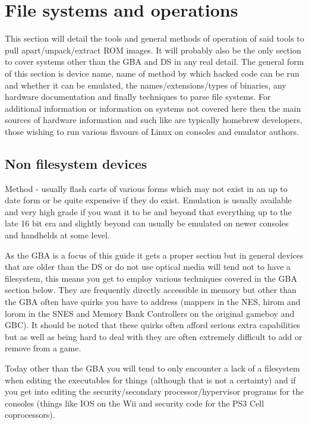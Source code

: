 \documentclass[
]{book}
\begin{document}
\hypertarget{file-systems-and-operations}{%
\section{File systems and operations}\label{file-systems-and-operations}}

This section will detail the tools and general methods of operation of said tools to pull apart/unpack/extract ROM images. It will probably also be the only section to cover systems other than the GBA and DS in any real detail. The general form of this section is device name, name of method by which hacked code can be run and whether it can be emulated, the names/extensions/types of binaries, any hardware documentation and finally techniques to parse file systems. For additional information or information on systems not covered here then the main sources of hardware information and such like are typically homebrew developers, those wishing to run various flavours of Linux on consoles and emulator authors.

\hypertarget{non-filesystem-devices}{%
\subsection{Non filesystem devices}\label{non-filesystem-devices}}

Method - usually flash carts of various forms which may not exist in an up to date form or be quite expensive if they do exist. Emulation is usually available and very high grade if you want it to be and beyond that everything up to the late 16 bit era and slightly beyond can usually be emulated on newer consoles and handhelds at some level.

As the GBA is a focus of this guide it gets a proper section but in general devices that are older than the DS or do not use optical media will tend not to have a filesystem, this means you get to employ various techniques covered in the GBA section below. They are frequently directly accessible in memory but other than the GBA often have quirks you have to address (mappers in the NES, hirom and lorom in the SNES and Memory Bank Controllers on the original gameboy and GBC). It should be noted that these quirks often afford serious extra capabilities but as well as being hard to deal with they are often extremely difficult to add or remove from a game.

Today other than the GBA you will tend to only encounter a lack of a filesystem when editing the executables for things (although that is not a certainty) and if you get into editing the security/secondary processor/hypervisor programs for the consoles (things like IOS on the Wii and security code for the PS3 Cell coprocessors).
\end{document}
